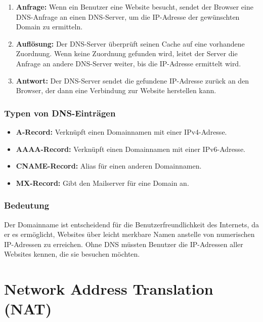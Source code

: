 \documentclass[
  nswissgerman,
  a4paper,
  DIV=11,
  numbers=noendperiod,
  ngerman]{scrreprt}
\providecommand{\tightlist}{%
  \setlength{\itemsep}{0pt}\setlength{\parskip}{0pt}}
\begin{document}
\begin{enumerate}
\def\labelenumi{\arabic{enumi}.}
\tightlist
\item
  \textbf{Anfrage:} Wenn ein Benutzer eine Website besucht, sendet der
  Browser eine DNS-Anfrage an einen DNS-Server, um die IP-Adresse der
  gewünschten Domain zu ermitteln.
\item
  \textbf{Auflösung:} Der DNS-Server überprüft seinen Cache auf eine
  vorhandene Zuordnung. Wenn keine Zuordnung gefunden wird, leitet der
  Server die Anfrage an andere DNS-Server weiter, bis die IP-Adresse
  ermittelt wird.
\item
  \textbf{Antwort:} Der DNS-Server sendet die gefundene IP-Adresse
  zurück an den Browser, der dann eine Verbindung zur Website herstellen
  kann.
\end{enumerate}

\subsection{Typen von DNS-Einträgen}\label{typen-von-dns-eintruxe4gen}

\begin{itemize}
\tightlist
\item
  \textbf{A-Record:} Verknüpft einen Domainnamen mit einer IPv4-Adresse.
\item
  \textbf{AAAA-Record:} Verknüpft einen Domainnamen mit einer
  IPv6-Adresse.
\item
  \textbf{CNAME-Record:} Alias für einen anderen Domainnamen.
\item
  \textbf{MX-Record:} Gibt den Mailserver für eine Domain an.
\end{itemize}

\subsection{Bedeutung}\label{bedeutung}

Der Domainname ist entscheidend für die Benutzerfreundlichkeit des
Internets, da er es ermöglicht, Websites über leicht merkbare Namen
anstelle von numerischen IP-Adressen zu erreichen. Ohne DNS müssten
Benutzer die IP-Adressen aller Websites kennen, die sie besuchen
möchten.

\chapter{Network Address Translation
(NAT)}\label{network-address-translation-nat}
\end{document}
